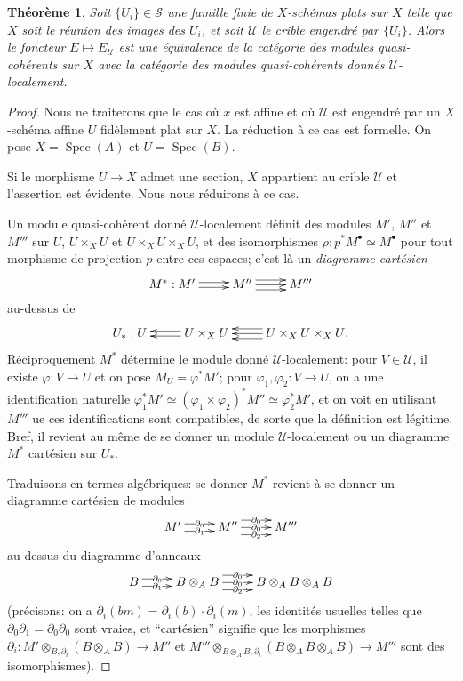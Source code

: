 \documentclass{book}
\DeclareMathOperator{\spec}{Spec}
\newcommand{\sS}{\mathscr{S}}
\newcommand{\sU}{\mathscr{U}}
\newtheorem{theorem}[subsubsection]{Théorème}
\begin{document}
\begin{theorem}\label{I:1-4-5}
Soit $\{U_i\}\in\sS$ une famille finie de $X$-schémas plats sur $X$ telle que 
$X$ soit le réunion des images des $U_i$, et soit $\sU$ le crible engendré par 
$\{U_i\}$. Alors le foncteur $E\mapsto E_\sU$ est une équivalence de la 
catégorie des modules quasi-cohérents sur $X$ avec la catégorie des modules 
quasi-cohérents donnés $\sU$-localement.
\end{theorem}
\begin{proof}
Nous ne traiterons que le cas où $x$ est affine et où $\sU$ est engendré par 
un $X$-schéma affine $U$ fidèlement plat sur $X$. La réduction à ce cas est 
formelle. On pose $X=\spec(A)$ et $U=\spec(B)$. 

Si le morphisme $U\to X$ admet une section, $X$ appartient au crible $\sU$ et 
l'assertion est évidente. Nous nous réduirons à ce cas. 

Un module quasi-cohérent donné $\sU$-localement définit des modules $M'$, $M''$ 
et $M'''$ sur $U$, $U\times_X U$ et $U\times_X U\times_X U$, et des 
isomorphismes $\rho:p^* M^\bullet\simeq M^\bullet$ pour tout morphisme de 
projection $p$ entre ces espaces; c'est là un \emph{diagramme cartésien} 
\[\xymatrix{
  M^* : M' \ar@<2pt>[r] \ar@<-2pt>[r] 
    & M'' \ar[r] \ar@<4pt>[r] \ar@<-4pt>[r] 
    & M'''
}\]
au-dessus de 
\[\xymatrix{
  U_* : U 
    & U\times_X U \ar@<2pt>[l] \ar@<-2pt>[l] 
    & U\times_X U\times_X U \ar[l] \ar@<4pt>[l] \ar@<-4pt>[l] \mbox{.}
}\]
Réciproquement $M^*$ détermine le module donné $\sU$-localement: pour 
$V\in\sU$, il existe $\varphi:V\to U$ et on pose $M_U=\varphi^* M'$; 
pour $\varphi_1,\varphi_2:V\to U$, on a une identification naturelle 
$\varphi_1^* M'\simeq (\varphi_1\times \varphi_2)^* M'' \simeq \varphi_2^* M'$, 
et on voit en utilisant $M'''$ ue ces identifications sont compatibles, de 
sorte que la définition est légitime. Bref, il revient au même de se donner un 
module $\sU$-localement ou un diagramme $M^*$ cartésien sur $U_*$. 

Traduisons en termes algébriques: se donner $M^*$ revient à se donner un 
diagramme cartésien de modules 
\[\xymatrix{
  M' \ar@<3pt>[r]|-{\partial_0} \ar@<-3pt>[r]|-{\partial_1} 
    & M'' \ar@<6pt>[r]|-{\partial_0} \ar[r]|-{\partial_0} \ar@<-6pt>[r]|-{\partial_2}
    & M'''
}\]
au-dessus du diagramme d'anneaux 
\[\xymatrix{
  B \ar@<3pt>[r]|-{\partial_0} \ar@<-3pt>[r]|-{\partial_1} 
    & B\otimes_A B \ar@<6pt>[r]|-{\partial_0} \ar[r]|-{\partial_0} \ar@<-6pt>[r]|-{\partial_2} 
    & B\otimes_A B\otimes_A B
}\]
(précisons: on a $\partial_i(b m)=\partial_i(b)\cdot\partial_i(m)$, les 
identités usuelles telles que $\partial_0\partial_1=\partial_0\partial_0$ 
sont vraies, et ``cartésien'' signifie que les morphismes 
$\partial_i:M'\otimes_{B,\partial_i}(B\otimes_A B)\to M''$ et 
$M'''\otimes_{B\otimes_A B,\partial_i}(B\otimes_A B\otimes_A B)\to M'''$ sont 
des isomorphismes). 


\end{proof}
\end{document}
